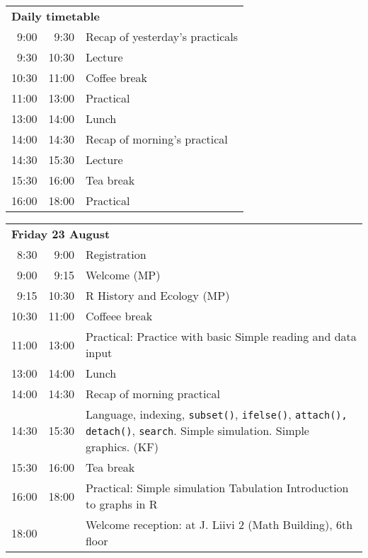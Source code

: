 \noindent
\begin{tabular}{r@{ -- }rp{13cm}}
\multicolumn{3}{l}{\bf Daily timetable} \\
 9:00 &  9:30 & Recap of yesterday's practicals \\
 9:30 & 10:30 & Lecture \\
10:30 & 11:00 & Coffee break \\
11:00 & 13:00 & Practical \\
13:00 & 14:00 & Lunch \\
14:00 & 14:30 & Recap of morning's practical \\
14:30 & 15:30 & Lecture \\
15:30 & 16:00 & Tea break \\
16:00 & 18:00 & Practical \\[2em]
\end{tabular}

\noindent
\begin{tabular}{r@{ -- }rp{13cm}}
\multicolumn{3}{l}{\bf Friday 23 August} \\
 8:30 &  9:00 & Registration \\
 9:00 &  9:15 & Welcome (MP) \\
 9:15 & 10:30 & R History and Ecology (MP) \\
10:30 & 11:00 & Coffeee break \\
11:00 & 13:00 & Practical:
                Practice with basic \R \newline
                Simple reading and data input \\
13:00 & 14:00 & Lunch \\
14:00 & 14:30 & Recap of morning practical \\
14:30 & 15:30 & Language, indexing,
                {\tt subset()}, {\tt ifelse()},
                \texttt{attach(), detach()},
                \texttt{search}. Simple simulation. Simple graphics. (KF)\\
15:30 & 16:00 & Tea break\\
16:00 & 18:00 & Practical: Simple simulation \newline
                Tabulation\newline
                Introduction to graphs in R \\
18:00 &       & Welcome reception: at J. Liivi 2 (Math Building), 6th floor \\[1em]
\end{tabular}


